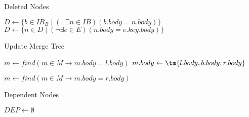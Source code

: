 \documentclass[../../Algorithms.tex]{subfiles}
\begin{document}
    \begin{algorithm}[H]
        \caption{Deleted Nodes}


        \BlankLine
        $D \leftarrow \{b \in IB_B \mid (\lnot \exists n \in IB)(b.body = n.body)\}$\;
        $D \leftarrow \{n \in D \mid (\lnot \exists e \in E)(n.body = e.key.body)\}$\;
        \;
    \end{algorithm}

    \begin{algorithm}[H]
        \caption{Update Merge Tree}


        \BlankLine
        $m \leftarrow find(m \in M \rightarrow m.body = l.body)$\;
        $m.body \leftarrow \tm{l.body, b.body, r.body}$\;

        \BlankLine
        $m \leftarrow find(m \in M \rightarrow m.body = r.body)$\;
        \;
    \end{algorithm}

    \begin{algorithm}[H]
        \caption{Dependent Nodes}


        \BlankLine
        $DEP \leftarrow \emptyset$\;

        \BlankLine
        \;
    \end{algorithm}
\end{document}
